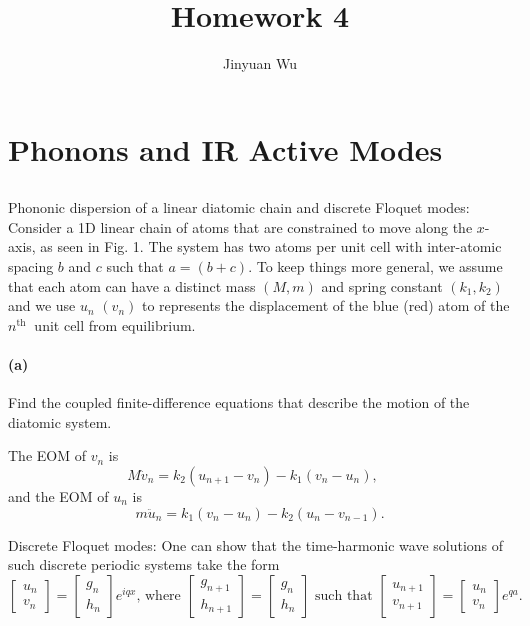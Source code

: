 \documentclass[hyperref, a4paper]{article}
\title{Homework 4}
\author{Jinyuan Wu}
\begin{document}
\maketitle

\section{Phonons and IR Active Modes}

\subsection{}

Phononic dispersion of a linear diatomic chain and discrete Floquet modes: Consider a 1D linear chain of atoms that are constrained to move along the $x$-axis, as seen in Fig. 1. The system has two atoms per unit cell with inter-atomic spacing $b$ and $c$ such that $a=(b+c)$. To keep things more general, we assume that each atom can have a distinct mass $(M, m)$ and spring constant $\left(k_1, k_2\right)$ and we use $u_n$ $\left(v_n\right)$ to represents the displacement of the blue (red) atom of the $n^{\text {th }}$ unit cell from equilibrium.

\paragraph*{(a)} Find the coupled finite-difference equations that describe the motion of the diatomic system.

The EOM of $v_n$ is 
\begin{equation}
    M \ddot{v}_n = k_2 (u_{n+1} - v_n) - k_1 (v_n - u_n), \quad 
\end{equation}
and the EOM of $u_n$ is 
\begin{equation}
    m \ddot{u}_n = k_1 (v_n - u_n) - k_2 (u_n - v_{n-1}).
\end{equation}

Discrete Floquet modes: One can show that the time-harmonic wave solutions of such discrete periodic systems take the form
$$
\left[\begin{array}{l}
u_n \\
v_n
\end{array}\right]=\left[\begin{array}{l}
g_n \\
h_n
\end{array}\right] e^{i q x} \text {, where }\left[\begin{array}{l}
g_{n+1} \\
h_{n+1}
\end{array}\right]=\left[\begin{array}{l}
g_n \\
h_n
\end{array}\right] \text { such that }\left[\begin{array}{l}
u_{n+1} \\
v_{n+1}
\end{array}\right]=\left[\begin{array}{l}
u_n \\
v_n
\end{array}\right] e^{q a} .
$$
\end{document}
